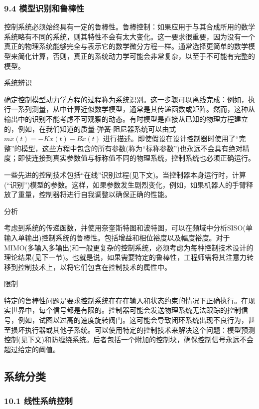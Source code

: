 \subsubsection{9.4 模型识别和鲁棒性}

控制系统必须始终具有一定的鲁棒性。鲁棒控制：如果应用于与其合成所用的数学系统略有不同的系统，则其特性不会有太大变化。这一要求很重要，因为没有一个真正的物理系统能够完全与表示它的数学微分方程一样。通常选择更简单的数学模型来简化计算，否则，真正的系统动力学可能会非常复杂，以至于不可能有完整的模型。

系统辨识

确定控制模型动力学方程的过程称为系统识别。这一步骤可以离线完成：例如，执行一系列测量，从中计算近似数学模型，通常是其传递函数或矩阵。然而，这种从输出中的识别不能考虑不可观察的动态。有时模型是直接从已知的物理方程建立的，例如，在我们知道的质量-弹簧-阻尼器系统可以由式$m\ddot{x}(t) = -Kx(t) - B\dot{x}(t)$ 进行描述。即使假设在设计控制器时使用了“完整”的模型，这些方程中包含的所有参数(称为“标称参数”)也永远不会具有绝对精度；即使连接到真实参数值与标称值不同的物理系统，控制系统也必须正确运行。

一些先进的控制技术包括“在线”识别过程(见下文)。当控制器本身运行时，计算(“识别”)模型的参数。这样，如果参数发生剧烈变化，例如，如果机器人的手臂释放了重量，控制器将进行自我调整以确保正确的性能。

分析

考虑到系统的传递函数，并使用奈奎斯特图和波特图，可以在频域中分析SISO(单输入单输出)控制系统的鲁棒性。包括增益和相位裕度以及幅度裕度。对于MIMO(多输入多输出)和一般更复杂的控制系统，必须考虑为每种控制技术设计的理论结果(见下一节)。也就是说，如果需要特定的鲁棒性，工程师需将其注意力转移到控制技术上，以将它们包含在控制技术的属性中。

限制

特定的鲁棒性问题是要求控制系统在存在输入和状态约束的情况下正确执行。在现实世界中，每个信号都是有限的。控制器可能会发送物理系统无法跟踪的控制信号，例如，试图以过高的速度旋转阀门。这可能会导致闭环系统出现不良行为，甚至损坏执行器或其他子系统。可以使用特定的控制技术来解决这个问题：模型预测控制(见下文)和防缠绕系统。后者包括一个附加的控制块，确保控制信号永远不会超过给定的阈值。

\subsection{系统分类}

\subsubsection{10.1 线性系统控制}

